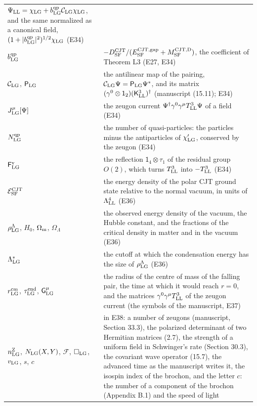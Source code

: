 \documentclass[
  10pt,
]{article}
\begin{document}
\begin{longtable}[]{@{}
  >{\raggedright\arraybackslash}p{}
  >{\raggedright\arraybackslash}p{}@{}}
\(\Psi_{\rm LL}=\chi_{\rm LG}+b^{\rm qp}_{\rm LG}\mathcal C_{\rm LG}\chi_{\rm LG}\),
and the same normalized as a canonical field,
\((1+\lvert b^{\rm qp}_{\rm LG}\rvert^2)^{1/2}\chi_{\rm LG}\) (E34) \\
\(b^{\rm qp}_{\rm LG}\) &
\(-D^{\rm CJT}_{\rm SF}/(E^{\rm CJT,gap}_{\rm SF}+M^{\rm CJT,D}_{\rm SF})\),
the coefficient of Theorem L3 (E27, E34) \\
\(\mathcal C_{\rm LG}\), \(\mathsf P_{\rm LG}\) & the antilinear map of
the pairing, \(\mathcal C_{\rm LG}\Psi=\mathsf P_{\rm LG}\Psi^*\), and
its matrix
\((\gamma^0\otimes\mathsf 1_2)(\mathsf K^3_{\rm LL})^\dagger\)
(manuscript (15.11); E34) \\
\(J^\mu_{\rm LG}[\Psi]\) & the zeugon current
\(\Psi^\dagger\gamma^0\gamma^\mu T^3_{\rm LL}\Psi\) of a field (E34) \\
\(N^{\rm qp}_{\rm LG}\) & the number of quasi-particles: the particles
minus the antiparticles of \(\chi'_{\rm LG}\), conserved by the zeugon
(E34) \\
\(\mathsf F^{\rm v}_{\rm LG}\) & the reflection
\(\mathsf 1_4\otimes\tau_1\) of the residual group \(O(2)\), which turns
\(T^3_{\rm LL}\) into \(-T^3_{\rm LL}\) (E34) \\
\(\mathcal E^{\rm CJT}_{\rm SF}\) & the energy density of the polar CJT
ground state relative to the normal vacuum, in units of
\(\Lambda_{\rm LL}^4\) (E36) \\
\(\rho^\Lambda_{\rm LG}\), \(H_0\), \(\Omega_{\rm m}\),
\(\Omega_\Lambda\) & the observed energy density of the vacuum, the
Hubble constant, and the fractions of the critical density in matter and
in the vacuum (E36) \\
\(\Lambda^*_{\rm LG}\) & the cutoff at which the condensation energy has
the size of \(\rho^\Lambda_{\rm LG}\) (E36) \\
\(r^{\rm cm}_{\rm LG}\), \(\tau^{\rm end}_{\rm LG}\),
\(\mathsf G^\mu_{\rm LG}\) & the radius of the centre of mass of the
falling pair, the time at which it would reach \(r=0\), and the matrices
\(\gamma^0\gamma^\mu T^3_{\rm LL}\) of the zeugon current (the symbols
of the manuscript, E37) \\
\(n^{\rm Z}_{\rm LG}\), \(N_{\rm LG}(X,Y)\), \(\mathcal F\),
\(\Box_{\rm LG}\), \(v_{\rm LG}\), \(s\), \(c\) & in E38: a number of
zeugons (manuscript, Section 33.3), the polarized determinant of two
Hermitian matrices (2.7), the strength of a uniform field in Schwinger's
rate (Section 30.3), the covariant wave operator (15.7), the advanced
time as the manuscript writes it, the isospin index of the brochon, and
the letter \(c\): the number of a component of the brochon (Appendix
B.1) and the speed of light \\
\end{longtable}
\end{document}
